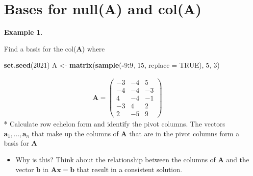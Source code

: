 \documentclass[
]{book}
\newenvironment{Shaded}{\begin{snugshade}}{\end{snugshade}}
\newcommand{\DataTypeTok}[1]{\textcolor[rgb]{0.13,0.29,0.53}{#1}}
\newcommand{\DecValTok}[1]{\textcolor[rgb]{0.00,0.00,0.81}{#1}}
\newcommand{\KeywordTok}[1]{\textcolor[rgb]{0.13,0.29,0.53}{\textbf{#1}}}
\newcommand{\NormalTok}[1]{#1}
\newcommand{\OperatorTok}[1]{\textcolor[rgb]{0.81,0.36,0.00}{\textbf{#1}}}
\newcommand{\OtherTok}[1]{\textcolor[rgb]{0.56,0.35,0.01}{#1}}
\newcommand{\StringTok}[1]{\textcolor[rgb]{0.31,0.60,0.02}{#1}}
\providecommand{\tightlist}{%
  \setlength{\itemsep}{0pt}\setlength{\parskip}{0pt}}
\theoremstyle{definition}
\theoremstyle{definition}
\newtheorem{example}{Example}[chapter]
\theoremstyle{definition}
\theoremstyle{remark}
\begin{document}
\hypertarget{bases-for-nullmathbfa-and-colmathbfa}{%
\section{\texorpdfstring{Bases for null(\(\mathbf{A}\)) and col(\(\mathbf{A}\))}{Bases for null(\textbackslash mathbf\{A\}) and col(\textbackslash mathbf\{A\})}}\label{bases-for-nullmathbfa-and-colmathbfa}}

\begin{example}
\protect\hypertarget{exm:unlabeled-div-130}{}\label{exm:unlabeled-div-130}

Find a basis for the col(\(\mathbf{A}\)) where

\begin{Shaded}
\begin{Highlighting}[]
\KeywordTok{set.seed}\NormalTok{(}\DecValTok{2021}\NormalTok{)}
\NormalTok{A <-}\StringTok{ }\KeywordTok{matrix}\NormalTok{(}\KeywordTok{sample}\NormalTok{(}\OperatorTok{-}\DecValTok{9}\OperatorTok{:}\DecValTok{9}\NormalTok{, }\DecValTok{15}\NormalTok{, }\DataTypeTok{replace =} \OtherTok{TRUE}\NormalTok{), }\DecValTok{5}\NormalTok{, }\DecValTok{3}\NormalTok{)}
\end{Highlighting}
\end{Shaded}

\[
\begin{aligned}
\mathbf{A} = \begin{pmatrix} -3 & -4 & 5 \\ -4 & -4 & -3 \\ 4 & -4 & -1 \\ -3 & 4 & 2 \\ 2 & -5 & 9 \end{pmatrix}
\end{aligned}
\]
* Calculate row echelon form and identify the pivot columns. The vectors \(\mathbf{a}_1, \ldots, \mathbf{a}_n\) that make up the columns of \(\mathbf{A}\) that are in the pivot columns form a basis for \(\mathbf{A}\)

\begin{itemize}
\tightlist
\item
  Why is this? Think about the relationship between the columns of \(\mathbf{A}\) and the vector \(\mathbf{b}\) in \(\mathbf{A} \mathbf{x} = \mathbf{b}\) that result in a consistent solution.
\end{itemize}

\end{example}
\end{document}
